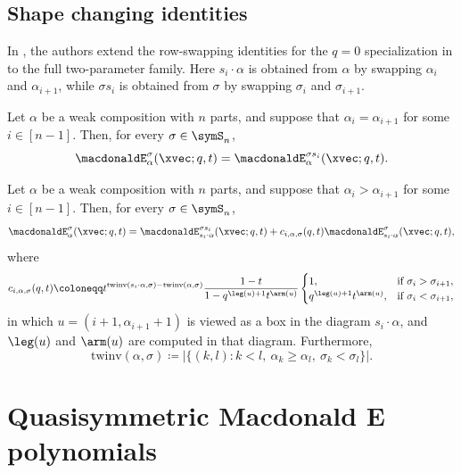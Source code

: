 \subsection[macdonaldEPermShape]{Shape changing identities}

In \cite{MouraMandelshtam2026x,MouraMandelshtam2025x}, the authors extend
the row-swapping identities for the $q=0$ specialization
in \cite[Prop.~5.5]{AlexanderssonSawhney2019} to the full two-parameter family.
Here $s_i\cdot\alpha$ is obtained from $\alpha$ by swapping $\alpha_i$ and
$\alpha_{i+1}$, while $\sigma s_i$ is obtained from $\sigma$ by swapping
$\sigma_i$ and $\sigma_{i+1}$.

\begin{theorem}
Let $\alpha$ be a weak composition with $n$ parts, and suppose that
$\alpha_i=\alpha_{i+1}$ for some $i\in[n-1]$. Then, for every
$\sigma\in\symS_n$,
\[
\macdonaldE^\sigma_\alpha(\xvec;q,t)
=
\macdonaldE^{\sigma s_i}_\alpha(\xvec;q,t).
\]
\end{theorem}

\begin{theorem}
Let $\alpha$ be a weak composition with $n$ parts, and suppose that
$\alpha_i>\alpha_{i+1}$ for some $i\in[n-1]$. Then, for every
$\sigma\in\symS_n$,
\[
\macdonaldE^\sigma_\alpha(\xvec;q,t)
=
\macdonaldE^{\sigma s_i}_{s_i\cdot\alpha}(\xvec;q,t)
+ c_{i,\alpha,\sigma}(q,t)
\macdonaldE^\sigma_{s_i\cdot\alpha}(\xvec;q,t),
\]
where
\[
c_{i,\alpha,\sigma}(q,t)
\coloneqq
t^{\mathrm{twinv}(s_i\cdot\alpha,\sigma)-\mathrm{twinv}(\alpha,\sigma)}
\frac{1-t}{1-q^{\leg(u)+1}t^{\arm(u)}}
\begin{cases}
1, & \text{if } \sigma_i>\sigma_{i+1},\\
q^{\leg(u)+1}t^{\arm(u)}, & \text{if } \sigma_i<\sigma_{i+1},
\end{cases}
\]
in which $u=(i+1,\alpha_{i+1}+1)$ is viewed as a box in the diagram
$s_i\cdot\alpha$, and $\leg(u)$ and $\arm(u)$ are computed in that diagram.
Furthermore,
\[
\mathrm{twinv}(\alpha,\sigma)
\coloneqq
\left|\{(k,l): k\lt l,\ \alpha_k\geq \alpha_l,\ \sigma_k\lt\sigma_l\}\right|.
\]
\end{theorem}


\section[macdonaldEQuasi]{Quasisymmetric Macdonald E polynomials}


